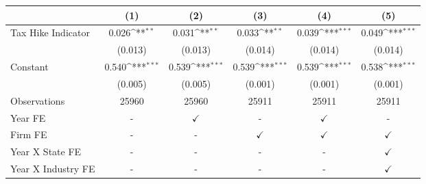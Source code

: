 {
\def\sym#1{\ifmmode^{#1}\else\(^{#1}\)\fi}
\begin{tabular}{l*{5}{c}}
\toprule
                    &\multicolumn{1}{c}{(1)}         &\multicolumn{1}{c}{(2)}         &\multicolumn{1}{c}{(3)}         &\multicolumn{1}{c}{(4)}         &\multicolumn{1}{c}{(5)}         \\
\midrule
Tax Hike Indicator  &       0.026\sym{**} &       0.031\sym{**} &       0.033\sym{**} &       0.039\sym{***}&       0.049\sym{***}\\
                    &     (0.013)         &     (0.013)         &     (0.014)         &     (0.014)         &     (0.014)         \\
Constant            &       0.540\sym{***}&       0.539\sym{***}&       0.539\sym{***}&       0.539\sym{***}&       0.538\sym{***}\\
                    &     (0.005)         &     (0.005)         &     (0.001)         &     (0.001)         &     (0.001)         \\
\midrule
Observations        &       25960         &       25960         &       25911         &       25911         &       25911         \\
Year FE             &           -         &$\checkmark$         &           -         &$\checkmark$         &           -         \\
Firm FE             &           -         &           -         &$\checkmark$         &$\checkmark$         &$\checkmark$         \\
Year X State FE     &           -         &           -         &           -         &           -         &$\checkmark$         \\
Year X Industry FE  &           -         &           -         &           -         &           -         &$\checkmark$         \\
\bottomrule
\end{tabular}
}
